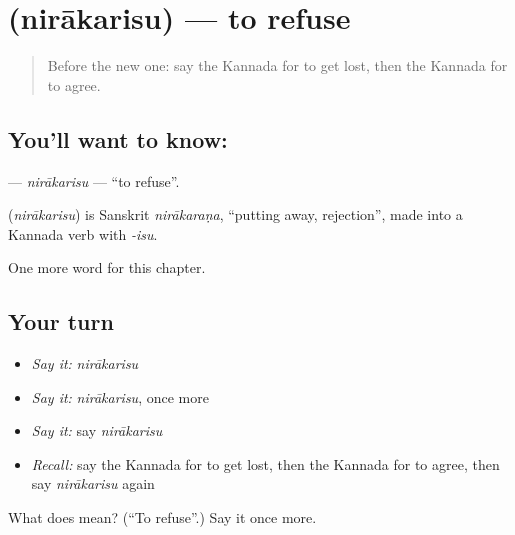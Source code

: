 \section[\texorpdfstring{\kn{ನಿರಾಕರಿಸು} (nirākarisu)}{ನಿರಾಕರಿಸು (nirākarisu)}]{ (nirākarisu) — to refuse}

\label{lesson:KA-C238-nirakarisu}



\begin{quote}
Before the new one: say the Kannada for to get lost, then the Kannada for to agree.
\end{quote}

\subsection*{You'll want to know: }
\textbf{} — \emph{nirākarisu} — \textquotedblleft{}to refuse\textquotedblright{}.

\begin{cousinweb}
\textbf{} (\emph{nirākarisu}) is Sanskrit \emph{nirākaraṇa}, \textquotedblleft{}putting away, rejection\textquotedblright{}, made into a Kannada verb with \emph{-isu}.
\end{cousinweb}

\begin{grammarlens}[title={What you've built}]
One more word for this chapter.
\end{grammarlens}

\subsection*{Your turn}
\begin{itemize}
\raggedright
  \item \emph{Say it:} \emph{nirākarisu}
  \item \emph{Say it:} \emph{nirākarisu}, once more
  \item \emph{Say it:} say \emph{nirākarisu}
  \item \emph{Recall:} say the Kannada for to get lost, then the Kannada for to agree, then say \emph{nirākarisu} again
\end{itemize}

\begin{tcolorbox}[breakable,colback=teal!4,colframe=teal!35!black,title={Before you move on}]
What does  mean? (\textquotedblleft{}To refuse\textquotedblright{}.) Say it once more.
\end{tcolorbox}
